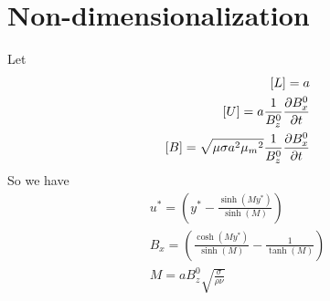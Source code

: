 \documentclass[11pt]{article}
\begin{document}
\section{Non-dimensionalization}
Let
\begin{equation}\begin{aligned}
[L] = a \\
[U] = a \frac{1}{B_z^0} \frac{\PD B_x^0}{\PD t} \\
[B] = \sqrt{\mu \sigma a^2 \M^2} \frac{1}{B_z^0} \frac{\PD B_x^0}{\PD t}
\end{aligned} \end{equation}
So we have
\begin{equation}\begin{aligned}
u^* = \left( y^* - \frac{\sinh(M y^*)}{\sinh(M)} \right) \\
B_x = \left( \frac{\cosh(M y^*)}{\sinh(M)} - \frac{1}{\tanh(M)} \right) \\
M = a B_z^0 \sqrt{\frac{\sigma}{\rho \nu}} \\
\end{aligned} \end{equation}

\end{document}
